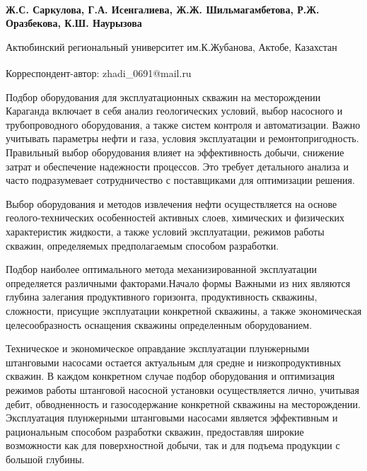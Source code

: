
\begin{articleheader}

{\bfseries
Ж.С. Саркулова\textsuperscript{\envelope },
Г.А. Исенгалиева,
Ж.Ж. Шильмагамбетова,
Р.Ж. Оразбекова,
К.Ш. Наурызова
}
\end{articleheader}

\begin{affiliation}
Актюбинский региональный университет им.К.Жубанова, Актобе, Казахстан

\raggedright \textsuperscript{\envelope }Корреспондент-автор: zhadi\_0691@mail.ru
\end{affiliation}

Подбор оборудования для эксплуатационных скважин на месторождении
Караганда включает в себя анализ геологических условий, выбор насосного
и трубопроводного оборудования, а также систем контроля и автоматизации.
Важно учитывать параметры нефти и газа, условия эксплуатации и
ремонтопригодность. Правильный выбор оборудования влияет на
эффективность добычи, снижение затрат и обеспечение надежности
процессов. Это требует детального анализа и часто подразумевает
сотрудничество с поставщиками для оптимизации решения.

Выбор оборудования и методов извлечения нефти осуществляется на основе
геолого-технических особенностей активных слоев, химических и физических
характеристик жидкости, а также условий эксплуатации, режимов работы
скважин, определяемых предполагаемым способом разработки.

Подбор наиболее оптимального метода механизированной эксплуатации
определяется различными факторами.Начало формы Важными из них являются
глубина залегания продуктивного горизонта, продуктивность скважины,
сложности, присущие эксплуатации конкретной скважины, а также
экономическая целесообразность оснащения скважины определенным
оборудованием.

Техническое и экономическое оправдание эксплуатации плунжерными
штанговыми насосами остается актуальным для средне и низкопродуктивных
скважин. В каждом конкретном случае подбор оборудования и оптимизация
режимов работы штанговой насосной установки осуществляется лично,
учитывая дебит, обводненность и газосодержание конкретной скважины на
месторождении. Эксплуатация плунжерными штанговыми насосами является
эффективным и рациональным способом разработки скважин, предоставляя
широкие возможности как для поверхностной добычи, так и для подъема
продукции с большой глубины.


